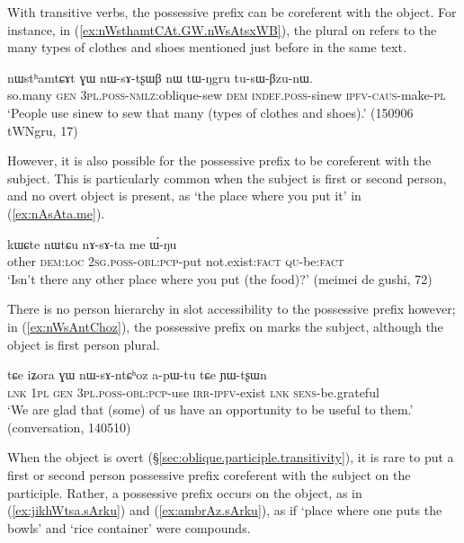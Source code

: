 With transitive verbs, the possessive prefix can be coreferent with the object. For instance, in (\ref{ex:nWsthamtCAt.GW.nWsAtsxWB}), the plural  on  refers to the many types of clothes and shoes mentioned just before in the same text.

 \begin{exe}
\ex \label{ex:nWsthamtCAt.GW.nWsAtsxWB}
\gll nɯstʰamtɕɤt ɣɯ nɯ-sɤ-tʂɯβ nɯ tɯ-ŋgru tu-sɯ-βzu-nɯ.   \\
so.many \textsc{gen} \textsc{3pl}.\textsc{poss}-\textsc{nmlz}:oblique-sew \textsc{dem} \textsc{indef}.\textsc{poss}-sinew \textsc{ipfv}-\textsc{caus}-make-\textsc{pl} \\
\glt `People use sinew to sew that many (types of clothes and shoes).' (150906 tWNgru, 17)
\end{exe} 

However, it is also possible for the possessive prefix to be coreferent with the subject. This is particularly common when the subject is first or second person, and no overt object is present, as  `the place where you put it' in (\ref{ex:nAsAta.me}).
 
 \begin{exe}
\ex \label{ex:nAsAta.me}
\gll   kɯɕte nɯtɕu nɤ-sɤ-ta me ɯ́-ŋu \\
other \textsc{dem}:\textsc{loc} \textsc{2sg}.\textsc{poss}-\textsc{obl}:\textsc{pcp}-put not.exist:\textsc{fact} \textsc{qu}-be:\textsc{fact} \\
\glt `Isn't there any other place where you put (the food)?' (meimei de gushi, 72)
 \end{exe} 

There is no person hierarchy in slot accessibility to the possessive prefix however; in (\ref{ex:nWsAntChoz}), the possessive prefix on  marks the subject, although the object is first person plural. 

 \begin{exe}
\ex \label{ex:nWsAntChoz}
\gll  tɕe iʑora ɣɯ nɯ-sɤ-ntɕʰoz a-pɯ-tu tɕe ɲɯ-tʂɯn \\
\textsc{lnk} \textsc{1pl} \textsc{gen} \textsc{3pl}.\textsc{poss}-\textsc{obl}:\textsc{pcp}-use \textsc{irr}-\textsc{ipfv}-exist \textsc{lnk} \textsc{sens}-be.grateful \\
\glt `We are glad that (some) of us have an opportunity to be useful to them.' (conversation, 140510)
 \end{exe}
   
When the object is overt (§\ref{sec:oblique.participle.transitivity}), it is rare to put a first or second person possessive prefix coreferent with the subject on the participle. Rather, a possessive prefix occurs on the object, as in (\ref{ex:jikhWtsa.sArku}) and (\ref{ex:ambrAz.sArku}), as if  `place where one puts the bowls' and  `rice container' were compounds.

